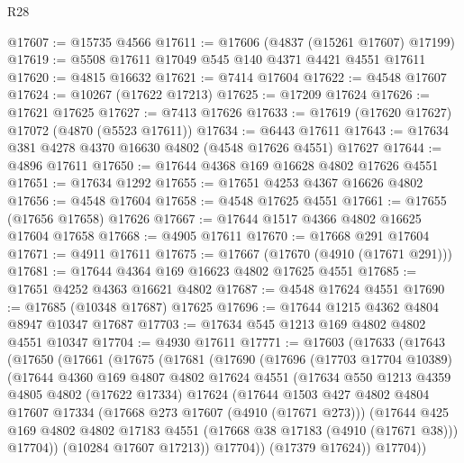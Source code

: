 \begin{lexlean}{R28}
\begin{coremodule}
@17607 := @15735 @4566
@17611 := @17606 (@4837 (@15261 @17607) @17199)
@17619 := @5508 @17611 @17049 @545 @140 @4371 @4421 @4551 @17611
@17620 := @4815 @16632
@17621 := @7414 @17604
@17622 := @4548 @17607
@17624 := @10267 (@17622 @17213)
@17625 := @17209 @17624
@17626 := @17621 @17625
@17627 := @7413 @17626
@17633 := @17619 (@17620 @17627) @17072 (@4870 (@5523 @17611))
@17634 := @6443 @17611
@17643 := @17634 @381 @4278 @4370 @16630 @4802 (@4548 @17626 @4551) @17627
@17644 := @4896 @17611
@17650 := @17644 @4368 @169 @16628 @4802 @17626 @4551
@17651 := @17634 @1292
@17655 := @17651 @4253 @4367 @16626 @4802
@17656 := @4548 @17604
@17658 := @4548 @17625 @4551
@17661 := @17655 (@17656 @17658) @17626
@17667 := @17644 @1517 @4366 @4802 @16625 @17604 @17658
@17668 := @4905 @17611
@17670 := @17668 @291 @17604
@17671 := @4911 @17611
@17675 := @17667 (@17670 (@4910 (@17671 @291)))
@17681 := @17644 @4364 @169 @16623 @4802 @17625 @4551
@17685 := @17651 @4252 @4363 @16621 @4802
@17687 := @4548 @17624 @4551
@17690 := @17685 (@10348 @17687) @17625
@17696 := @17644 @1215 @4362 @4804 @8947 @10347 @17687
@17703 := @17634 @545 @1213 @169 @4802 @4802 @4551 @10347
@17704 := @4930 @17611
@17771 := @17603
    (@17633
      (@17643
        (@17650
          (@17661
            (@17675
              (@17681
                (@17690
                  (@17696
                    (@17703 @17704 @10389)
                    (@17644
                      @4360
                      @169
                      @4807
                      @4802
                      @17624
                      @4551
                      (@17634
                        @550
                        @1213
                        @4359
                        @4805
                        @4802
                        (@17622 @17334)
                        @17624
                        (@17644
                          @1503
                          @427
                          @4802
                          @4804
                          @17607
                          @17334
                          (@17668 @273 @17607 (@4910 (@17671 @273)))
                          (@17644
                            @425
                            @169
                            @4802
                            @4802
                            @17183
                            @4551
                            (@17668 @38 @17183 (@4910 (@17671 @38)))
                            @17704))
                        (@10284 @17607 @17213))
                      @17704))
                  (@17379 @17624))
                @17704))

\end{coremodule}
\end{lexlean}
